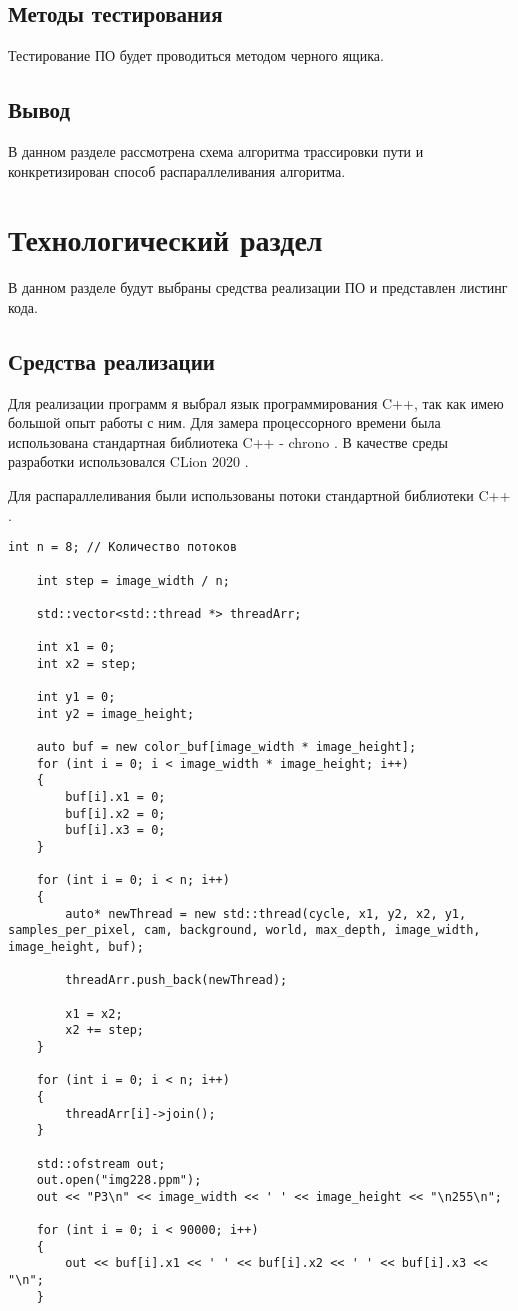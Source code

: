 \documentclass[utf8x, 12pt]{G7-32}
\begin{document}
    \section{Методы тестирования}
    Тестирование ПО будет проводиться методом черного ящика.

\section{Вывод}
В данном разделе рассмотрена схема алгоритма трассировки пути и конкретизирован способ распараллеливания алгоритма.


\chapter{ Технологический раздел}
\label{cha:technological}

    В данном разделе будут выбраны средства реализации ПО и представлен листинг кода. 


    \section{Средства реализации}
        Для реализации программ я выбрал язык программирования C++, так как имею большой опыт работы с ним.
	Для замера процессорного времени была использована стандартная библиотека C++ - chrono \cite{link_time}.
        В качестве среды разработки использовался CLion 2020 \cite{link4}.

	Для распараллеливания были использованы потоки стандартной библиотеки C++ \cite{link5}.


        \begin{lstlisting}[label=lst:rtx_parall, caption=Реализация алгоритма трассировки пути с параллельными вычислениями]
    int n = 8; // Количество потоков

    int step = image_width / n;

    std::vector<std::thread *> threadArr;

    int x1 = 0;
    int x2 = step;

    int y1 = 0;
    int y2 = image_height;

    auto buf = new color_buf[image_width * image_height];
    for (int i = 0; i < image_width * image_height; i++)
    {
        buf[i].x1 = 0;
        buf[i].x2 = 0;
        buf[i].x3 = 0;
    }

    for (int i = 0; i < n; i++)
    {
        auto* newThread = new std::thread(cycle, x1, y2, x2, y1, samples_per_pixel, cam, background, world, max_depth, image_width, image_height, buf);
        
		threadArr.push_back(newThread);

        x1 = x2;
        x2 += step;
    }

    for (int i = 0; i < n; i++)
    {
        threadArr[i]->join();
    }

    std::ofstream out;
    out.open("img228.ppm");
    out << "P3\n" << image_width << ' ' << image_height << "\n255\n";

    for (int i = 0; i < 90000; i++)
    {
        out << buf[i].x1 << ' ' << buf[i].x2 << ' ' << buf[i].x3 << "\n";
    }
        \end{lstlisting}
\end{document}

